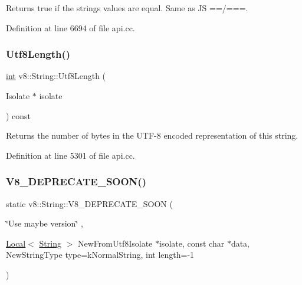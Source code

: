 Returns true if the strings values are equal. Same as JS ==/===. 

Definition at line 6694 of file api.\+cc.

\mbox{\label{classv8_1_1String_af99433ee51ed45337e5b4536bd28a834}} 
\subsubsection{\texorpdfstring{Utf8\+Length()}{Utf8Length()}}
{\footnotesize\ttfamily \mbox{\hyperlink{classint}{int}} v8\+::\+String\+::\+Utf8\+Length (\begin{DoxyParamCaption}\item[{Isolate $\ast$}]{isolate }\end{DoxyParamCaption}) const}

Returns the number of bytes in the U\+T\+F-\/8 encoded representation of this string. 

Definition at line 5301 of file api.\+cc.

\mbox{\label{classv8_1_1String_aa9d64688e3535b3daabafcc46a59ce5a}} 
\subsubsection{\texorpdfstring{V8\+\_\+\+D\+E\+P\+R\+E\+C\+A\+T\+E\+\_\+\+S\+O\+O\+N()}{V8\_DEPRECATE\_SOON()}\hspace{0.1cm}{\footnotesize\ttfamily [1/3]}}
{\footnotesize\ttfamily static v8\+::\+String\+::\+V8\+\_\+\+D\+E\+P\+R\+E\+C\+A\+T\+E\+\_\+\+S\+O\+ON (\begin{DoxyParamCaption}\item[{\char`\"{}Use maybe version\char`\"{}}]{,  }\item[{\mbox{\hyperlink{classv8_1_1Local}{Local}}$<$ \mbox{\hyperlink{classv8_1_1String}{String}} $>$ }]{New\+From\+Utf8Isolate $\ast$isolate, const char $\ast$data, New\+String\+Type type=k\+Normal\+String, int length=-\/1 }\end{DoxyParamCaption})\hspace{0.3cm}{\ttfamily [static]}}

